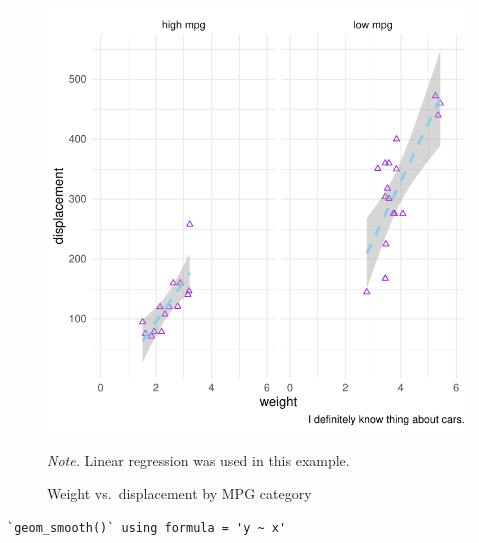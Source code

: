 \documentclass[
  man,
  floatsintext,
  longtable,
  nolmodern,
  notxfonts,
  notimes,
  colorlinks=true,linkcolor=blue,citecolor=blue,urlcolor=blue]{apa7}
\begin{document}
\begin{figure}[H]

{\caption{{Weight vs.~displacement by MPG
category}{\label{fig-plot5-faceted-scatterplot}}}}

\includegraphics{data-visualization_files/figure-pdf/fig-plot5-faceted-scatterplot-1.pdf}

{\noindent \emph{Note.} Linear regression was used in this example.}

\end{figure}

\begin{verbatim}
`geom_smooth()` using formula = 'y ~ x'
\end{verbatim}
\end{document}

